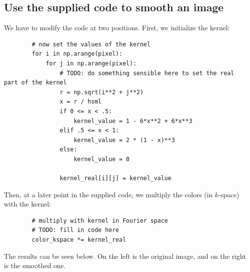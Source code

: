 \newpage
\subsection{Use the supplied code to smooth an image}
    We have to modify the code at two positions.
    First, we initialize the kernel:
    \begin{lstlisting}
        # now set the values of the kernel
        for i in np.arange(pixel):
            for j in np.arange(pixel):
                # TODO: do something sensible here to set the real part of the kernel
                r = np.sqrt(i**2 + j**2)
                x = r / hsml
                if 0 <= x < .5:
                    kernel_value = 1 - 6*x**2 + 6*x**3
                elif .5 <= x < 1:
                    kernel_value = 2 * (1 - x)**3
                else:
                    kernel_value = 0
        
                kernel_real[i][j] = kernel_value\end{lstlisting}
    Then, at a later point in the supplied code, 
    we multiply the colors (in $k$-space) with the kernel:
    \begin{lstlisting}
        # multiply with kernel in Fourier space
        # TODO: fill in code here
        color_kspace *= kernel_real\end{lstlisting}
    The results can be seen below. On the left is the original image, 
    and on the right is the smoothed one.
